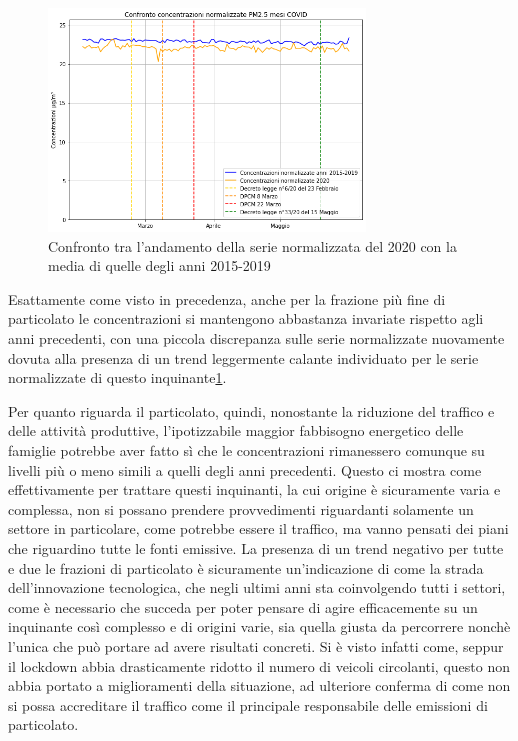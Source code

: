 \documentclass[a4paper,12pt]{report}
\begin{document}
\begin{figure}[h]
\centering
\includegraphics[width=0.75\textwidth]{pm25_covid_norm}
\caption{Confronto tra l'andamento della serie normalizzata del 2020 con la media di quelle degli anni 2015-2019}
\label{fig:pm25_covid_norm}
\end{figure}

Esattamente come visto in precedenza, anche per la frazione più fine di particolato le concentrazioni si mantengono abbastanza invariate rispetto agli anni precedenti, con una piccola discrepanza sulle serie normalizzate nuovamente dovuta alla presenza di un trend leggermente calante individuato per le serie normalizzate di questo inquinante\ref{fig:pm25_covid_norm}.

Per quanto riguarda il particolato, quindi, nonostante la riduzione del traffico e delle attività produttive, l'ipotizzabile maggior fabbisogno energetico
 delle famiglie potrebbe aver fatto sì che le concentrazioni rimanessero comunque su livelli più o meno simili a quelli degli anni precedenti.
Questo ci mostra come effettivamente per trattare questi inquinanti, la cui origine è sicuramente varia e complessa, non si possano prendere provvedimenti riguardanti solamente un settore in particolare, come potrebbe essere il traffico, ma vanno pensati dei piani che riguardino tutte le fonti emissive.
La presenza di un trend negativo per tutte e due le frazioni di particolato è sicuramente un'indicazione di come la strada dell'innovazione tecnologica, che negli ultimi anni sta coinvolgendo tutti i settori, come è necessario che succeda per poter pensare di agire efficacemente su un inquinante così complesso e di origini varie, sia quella giusta da percorrere nonchè l'unica che può portare ad avere risultati concreti. Si è visto infatti come, seppur il lockdown abbia drasticamente ridotto il numero di veicoli circolanti, questo non abbia portato a miglioramenti della situazione, ad ulteriore conferma di come non si possa accreditare il traffico come il principale responsabile delle emissioni di particolato.
\end{document}
